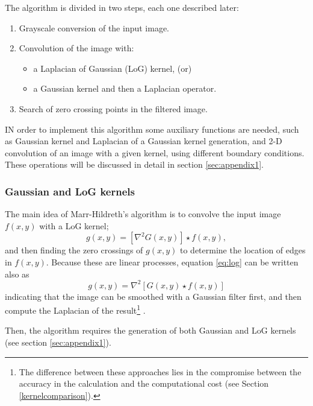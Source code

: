 \documentclass{ipol}
\numberwithin{equation}{section}
\numberwithin{table}{section}
\begin{document}
The algorithm is divided in two steps, each one described later:
\begin{enumerate}
	\item Grayscale conversion of the input image.
	\item Convolution of the image with:
	\begin{itemize}
		\item a Laplacian of Gaussian (LoG) kernel, (or)
		\item a Gaussian kernel and then a Laplacian operator.
	\end{itemize}
	\item Search of zero crossing points in the filtered image.
\end{enumerate}

IN order to implement this algorithm some auxiliary functions are needed, such as Gaussian kernel and Laplacian of a Gaussian 
kernel generation, and 2-D convolution of an image with a given kernel, 
using different boundary conditions. These operations will be discussed 
in detail in section \ref{sec:appendix1}.


\subsubsection{Gaussian and LoG kernels}

The main idea of Marr-Hildreth's algorithm is to convolve the input image $f(x,y)$ with a LoG kernel;
\begin{equation}\label{eq:log}
  g(x,y) = [\nabla^2G(x,y)]\star f(x,y), 
\end{equation}
and then finding the zero crossings of $g(x,y)$ to determine the location of edges in $f(x,y)$. 
Because these are linear processes, equation \ref{eq:log} can be written also as
\begin{equation}
  g(x,y) = \nabla^2[G(x,y)\star f(x,y)]
\end{equation}
indicating that the image can be smoothed with a Gaussian filter first, and then compute the Laplacian of the result\footnote{The difference between these approaches lies in the compromise between the accuracy in the calculation and the computational cost (see Section \ref{kernelcomparison}).} .

Then, the algorithm requires the generation of both Gaussian and LoG kernels (see section \ref{sec:appendix1}).\\
\end{document}
